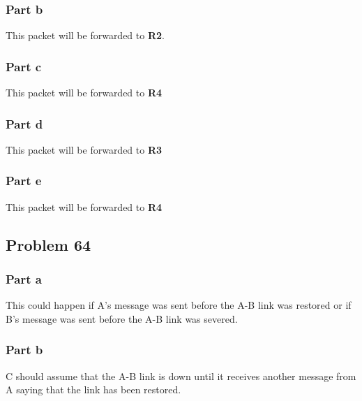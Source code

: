 \documentclass{article}%
\begin{document}
\subsubsection*{Part b}
This packet will be forwarded to \textbf{R2}.
\subsubsection*{Part c}
This packet will be forwarded to \textbf{R4}
\subsubsection*{Part d}
This packet will be forwarded to \textbf{R3}
\subsubsection*{Part e}
This packet will be forwarded to \textbf{R4}

\subsection*{Problem 64}
\subsubsection*{Part a}
This could happen if A's message was sent before the A-B link was restored
or if B's message was sent before the A-B link was severed.
\subsubsection*{Part b}
C should assume that the A-B link is down until it receives another message from A saying
that the link has been restored.
\end{document}
